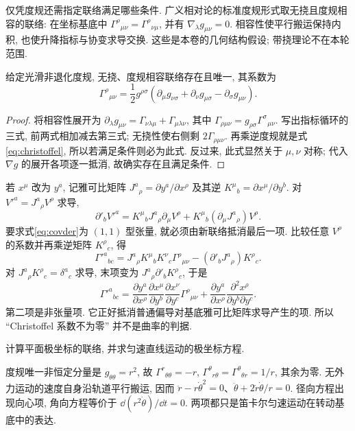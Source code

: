仅凭度规还需指定联络满足哪些条件. 广义相对论的标准度规形式取无挠且度规相容的联络: 在坐标基底中 $\Gamma^\rho{}_{\mu\nu}=\Gamma^\rho{}_{\nu\mu}$, 并有 $\nabla_\lambda g_{\mu\nu}=0$. 相容性使平行搬运保持内积, 也使升降指标与协变求导交换. 这些是本卷的几何结构假设; 带挠理论不在本轮范围.

\begin{theorem}\label{thm:christoffel}
给定光滑非退化度规, 无挠、度规相容联络存在且唯一, 其系数为
\begin{equation}\label{eq:christoffel}
\Gamma^\rho{}_{\mu\nu}=\frac12g^{\rho\sigma}
(\partial_\mu g_{\nu\sigma}+\partial_\nu g_{\mu\sigma}-\partial_\sigma g_{\mu\nu}).
\end{equation}
\end{theorem}
\begin{proof}
将相容性展开为 $\partial_\lambda g_{\mu\nu}=\Gamma_{\nu\lambda\mu}+\Gamma_{\mu\lambda\nu}$, 其中 $\Gamma_{\rho\mu\nu}=g_{\rho\sigma}\Gamma^\sigma{}_{\mu\nu}$. 写出指标循环的三式, 前两式相加减去第三式; 无挠性使右侧剩 $2\Gamma_{\rho\mu\nu}$. 再乘逆度规就是式\eqref{eq:christoffel}, 所以若满足条件则必为此式. 反过来, 此式显然关于 $\mu,\nu$ 对称; 代入 $\nabla g$ 的展开各项逐一抵消, 故确实存在且满足条件.
\end{proof}

若 $x^\mu$ 改为 $y^a$, 记雅可比矩阵 $J^a{}_\rho=\partial y^a/\partial x^\rho$ 及其逆 $K^\mu{}_b=\partial x^\mu/\partial y^b$. 对 $V'^a=J^a{}_\rho V^\rho$ 求导,
\[
\partial'_b V'^a=K^\mu{}_b J^a{}_\rho\partial_\mu V^\rho
+K^\mu{}_b(\partial_\mu J^a{}_\rho)V^\rho.
\]
要求式\eqref{eq:covder}为 $(1,1)$ 型张量, 就必须由新联络抵消最后一项. 比较任意 $V^\rho$ 的系数并再乘逆矩阵 $K^\rho{}_c$, 得
\[
\Gamma'^a{}_{bc}=J^a{}_\rho K^\mu{}_bK^\nu{}_c\Gamma^\rho{}_{\mu\nu}
-(\partial'_b J^a{}_\rho)K^\rho{}_c.
\]
对 $J^a{}_\rho K^\rho{}_c=\delta^a{}_c$ 求导, 末项变为 $J^a{}_\rho\partial'_bK^\rho{}_c$, 于是
\begin{equation}\label{eq:connection-transform}
\Gamma'^a{}_{bc}=\frac{\partial y^a}{\partial x^\rho}
\frac{\partial x^\mu}{\partial y^b}\frac{\partial x^\nu}{\partial y^c}\Gamma^\rho{}_{\mu\nu}
+\frac{\partial y^a}{\partial x^\rho}\frac{\partial^2 x^\rho}{\partial y^b\partial y^c}.
\end{equation}
第二项是非张量项. 它正好抵消普通偏导对基底雅可比矩阵求导产生的项. 所以 ``Christoffel 系数不为零'' 并不是曲率的判据.

\begin{example}
计算平面极坐标的联络, 并求匀速直线运动的极坐标方程.
\end{example}
\begin{solution}
度规唯一非恒定分量是 $g_{\theta\theta}=r^2$, 故 $\Gamma^r{}_{\theta\theta}=-r$, $\Gamma^\theta{}_{r\theta}=\Gamma^\theta{}_{\theta r}=1/r$, 其余为零. 无外力运动的速度自身沿轨道平行搬运, 因而
$\ddot r-r\dot\theta^2=0$、$\ddot\theta+2\dot r\dot\theta/r=0$.
径向方程出现向心项, 角向方程等价于 $\dd(r^2\dot\theta)/\dd t=0$. 两项都只是笛卡尔匀速运动在转动基底中的表达.
\end{solution}

